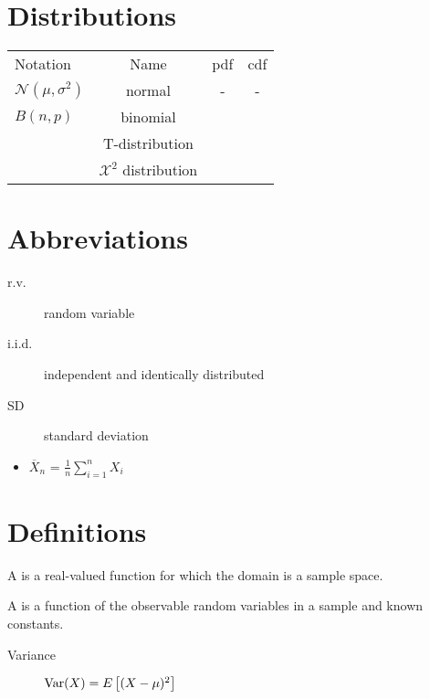 
\section{Distributions}

\begin{tabular}{ l c c c }

 Notation & Name & pdf & cdf \\
 $\mathcal{N}(\mu, \sigma^2)$ & normal & - & - \\
 $B(n, p)$ & binomial \\
 & T-distribution \\
 & $\mathcal{X}^2$ distribution \\

\end{tabular}


\section{Abbreviations}

\begin{description}
\item[r.v.] random variable
\item[i.i.d.] independent and identically distributed
\item[SD] standard deviation
\end{description}

\begin{itemize}
\item $\overline{X}_n$ = $\frac{1}{n}\sum_{i=1}^n X_i$
\end{itemize}

\section{Definitions}

A  is a real-valued function for which the domain is a sample space.

A  is a function of the observable random variables in a sample and known constants.

\begin{description}
\item[Variance] $\mathrm{Var}(X) = E\left[(X-\mu)^2\right]$
\end{description}